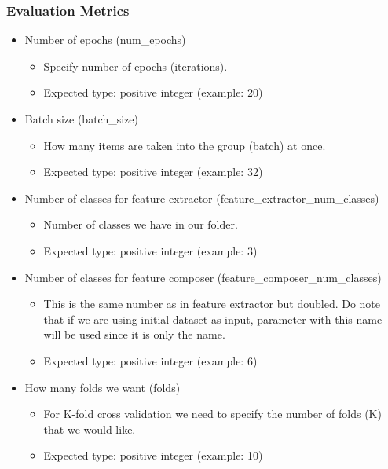\subsubsection{Evaluation Metrics}
\begin{itemize}
    \item Number of epochs (num{\_}epochs)
    \begin{itemize}
        \item Specify number of epochs (iterations). 
        \item Expected type: positive integer (example: 20)
    \end{itemize}
    
    \item Batch size (batch{\_}size)
    \begin{itemize}
        \item How many items are taken into the group (batch) at once.
        \item Expected type: positive integer (example: 32)
    \end{itemize}
    
    \item Number of classes for feature extractor (feature{\_}extractor{\_}num{\_}classes)
    \begin{itemize}
        \item Number of classes we have in our folder.
        \item Expected type: positive integer (example: 3)
    \end{itemize}
    
    \item Number of classes for feature composer (feature{\_}composer{\_}num{\_}classes)
    \begin{itemize}
        \item This is the same number as in feature extractor but doubled. Do note that if we are using initial dataset as input, parameter with this name will be used since it is only the name.
        \item Expected type: positive integer (example: 6)
    \end{itemize}
    
    \item How many folds we want (folds)
    \begin{itemize}
        \item For K-fold cross validation we need to specify the number of folds (K) that we would like.
        \item Expected type: positive integer (example: 10)
    \end{itemize}
    

\end{itemize}
